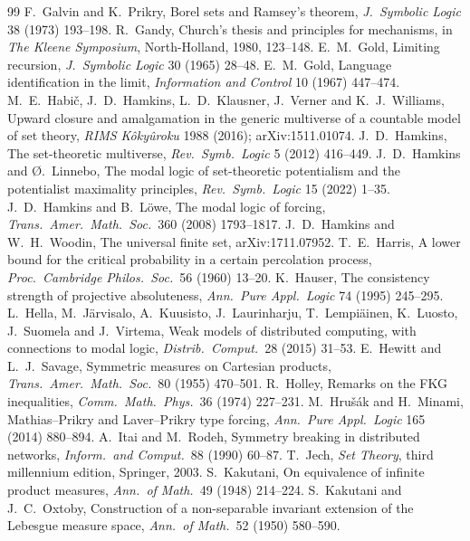 \documentclass[11pt]{article}
\theoremstyle{definition}
\theoremstyle{remark}
\begin{document}
\begin{thebibliography}{99}
 F.~Galvin and K.~Prikry, Borel sets and Ramsey's theorem, \emph{J.\ Symbolic Logic} 38 (1973) 193--198.
 R.~Gandy, Church's thesis and principles for mechanisms, in \emph{The Kleene Symposium}, North-Holland, 1980, 123--148.
 E.~M.~Gold, Limiting recursion, \emph{J.\ Symbolic Logic} 30 (1965) 28--48.
 E.~M.~Gold, Language identification in the limit, \emph{Information and Control} 10 (1967) 447--474.
 M.~E.~Habi\v{c}, J.~D.~Hamkins, L.~D.~Klausner, J.~Verner and K.~J.~Williams, Upward closure and amalgamation in the generic multiverse of a countable model of set theory, \emph{RIMS K\^oky\^uroku} 1988 (2016); arXiv:1511.01074.
 J.~D.~Hamkins, The set-theoretic multiverse, \emph{Rev.\ Symb.\ Logic} 5 (2012) 416--449.
 J.~D.~Hamkins and \O.~Linnebo, The modal logic of set-theoretic potentialism and the potentialist maximality principles, \emph{Rev.\ Symb.\ Logic} 15 (2022) 1--35.
 J.~D.~Hamkins and B.~L\"owe, The modal logic of forcing, \emph{Trans.\ Amer.\ Math.\ Soc.}\ 360 (2008) 1793--1817.
 J.~D.~Hamkins and W.~H.~Woodin, The universal finite set, arXiv:1711.07952.
 T.~E.~Harris, A lower bound for the critical probability in a certain percolation process, \emph{Proc.\ Cambridge Philos.\ Soc.}\ 56 (1960) 13--20.
 K.~Hauser, The consistency strength of projective absoluteness, \emph{Ann.\ Pure Appl.\ Logic} 74 (1995) 245--295.
 L.~Hella, M.~J\"arvisalo, A.~Kuusisto, J.~Laurinharju, T.~Lempi\"ainen, K.~Luosto, J.~Suomela and J.~Virtema, Weak models of distributed computing, with connections to modal logic, \emph{Distrib.\ Comput.}\ 28 (2015) 31--53.
 E.~Hewitt and L.~J.~Savage, Symmetric measures on Cartesian products, \emph{Trans.\ Amer.\ Math.\ Soc.}\ 80 (1955) 470--501.
 R.~Holley, Remarks on the FKG inequalities, \emph{Comm.\ Math.\ Phys.}\ 36 (1974) 227--231.
 M.~Hru\v{s}\'ak and H.~Minami, Mathias--Prikry and Laver--Prikry type forcing, \emph{Ann.\ Pure Appl.\ Logic} 165 (2014) 880--894.
 A.~Itai and M.~Rodeh, Symmetry breaking in distributed networks, \emph{Inform.\ and Comput.}\ 88 (1990) 60--87.
 T.~Jech, \emph{Set Theory}, third millennium edition, Springer, 2003.
 S.~Kakutani, On equivalence of infinite product measures, \emph{Ann.\ of Math.}\ 49 (1948) 214--224.
 S.~Kakutani and J.~C.~Oxtoby, Construction of a non-separable invariant extension of the Lebesgue measure space, \emph{Ann.\ of Math.}\ 52 (1950) 580--590.

\end{thebibliography}
\end{document}

